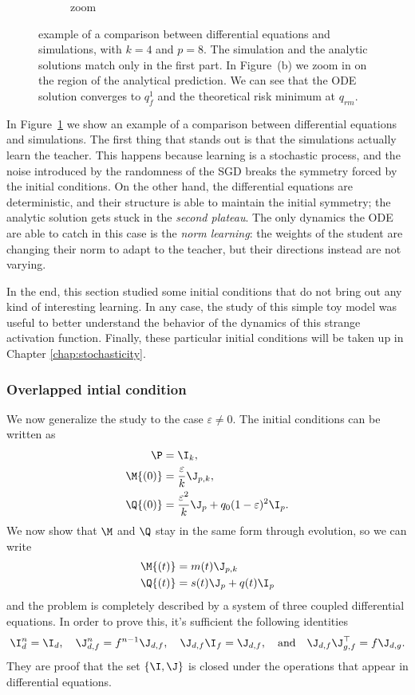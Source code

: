 \begin{figure}
\begin{subfigure}{0.495\textwidth}
    \caption{zoom}
  \end{subfigure}
  \caption{
    example of a comparison between differential equations and simulations, with \(k=4\) and \(p=8\).
    The simulation and the analytic solutions match only in the first part.
    In Figure~(b) we zoom in on the region of the analytical prediction. We can see
    that the ODE solution converges to \(q_f^1\) and the theoretical risk minimum at \(q_{rm}\).
  }
  \label{fig:example-eps0}
\end{figure}
In Figure~\ref{fig:example-eps0} we show an example of a comparison between differential equations and simulations.
The first thing that stands out is that the simulations actually learn the teacher.
This happens because learning is a stochastic process, and the noise introduced
by the randomness of the SGD breaks the symmetry forced by the initial conditions.
On the other hand, the differential equations are deterministic, and their structure
is able to maintain the initial symmetry; the analytic solution gets stuck in the 
\emph{second plateau}. The only dynamics the ODE are able to catch in this case is 
the \emph{norm learning}: the weights of the student are changing their norm to adapt 
to the teacher, but their directions instead are not varying.

In the end, this section studied some initial conditions that do not bring out any kind of interesting learning.
In any case, the study of this simple toy model was useful to better understand the behavior of the dynamics of this strange activation function.
Finally, these particular initial conditions will be taken up in Chapter \ref{chap:stochasticity}.

\subsubsection{Overlapped intial condition}
We now generalize the study to the case \(\varepsilon\neq0\).
The initial conditions can be written as
\[\begin{split}
    \P &= \I_k,\\
    \M{(0)} &= \frac{\varepsilon}{k}\J_{p,k},\\
    \Q{(0)} &= \frac{\varepsilon^2}{k}\J_{p} + q_0(1-\varepsilon)^2\I_{p}.\\
\end{split}\]
We now show that \(\M\) and \(\Q\) stay in the same form through evolution, so we can write
\[\begin{split}
    \M{(t)} &= m{(t)} \J_{p,k} \\
    \Q{(t)} &= s{(t)} \J_{p} + q{(t)}\I_{p} \\
\end{split}\]
and the problem is completely described by a system of three coupled differential equations.
In order to prove this, it's sufficient the following identities
\[
    \I_d^n=\I_d, \quad \J_{d,f}^n = f^{n-1}\J_{d,f}, \quad \J_{d,f}\I_f = \J_{d,f}, \quad\text{and}\quad
    \J_{d,f} \J_{g,f}^\top = f \J_{d,g}.
\]
They are proof that the set \(\{\I,\J\}\) is closed under the operations that appear in differential equations.

